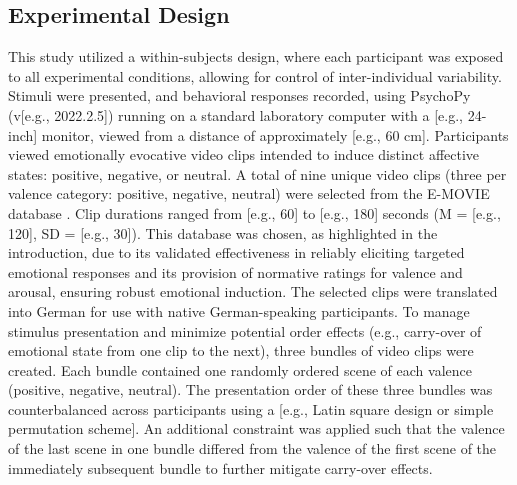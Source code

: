 \subsection{Experimental Design}
This study utilized a within-subjects design, where each participant was exposed to all experimental conditions, allowing for control of inter-individual variability. Stimuli were presented, and behavioral responses recorded, using PsychoPy (v[e.g., 2022.2.5]) \parencite{peircePsychoPyPsychophysicsSoftware2007, peircePsychoPy2BuilderCoder2019} running on a standard laboratory computer with a [e.g., 24-inch] monitor, viewed from a distance of approximately [e.g., 60 cm]. Participants viewed emotionally evocative video clips intended to induce distinct affective states: positive, negative, or neutral. A total of nine unique video clips (three per valence category: positive, negative, neutral) were selected from the E-MOVIE database \parencite{maffeiEMOVIEExperimentalMOVies2019}. Clip durations ranged from [e.g., 60] to [e.g., 180] seconds (M = [e.g., 120], SD = [e.g., 30]). This database was chosen, as highlighted in the introduction, due to its validated effectiveness in reliably eliciting targeted emotional responses and its provision of normative ratings for valence and arousal, ensuring robust emotional induction. The selected clips were translated into German for use with native German-speaking participants. To manage stimulus presentation and minimize potential order effects (e.g., carry-over of emotional state from one clip to the next), three bundles of video clips were created. Each bundle contained one randomly ordered scene of each valence (positive, negative, neutral). The presentation order of these three bundles was counterbalanced across participants using a [e.g., Latin square design or simple permutation scheme]. An additional constraint was applied such that the valence of the last scene in one bundle differed from the valence of the first scene of the immediately subsequent bundle to further mitigate carry-over effects.

